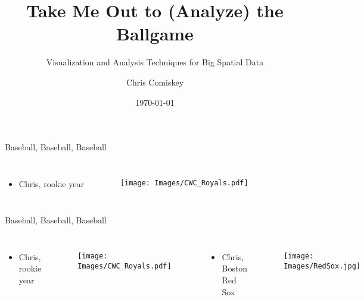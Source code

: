 \documentclass{beamer}
\title{Take Me Out to (Analyze) the Ballgame}
\subtitle{Visualization and Analysis Techniques for Big Spatial Data}
\author{Chris Comiskey}
\institute{Oregon State University}
\date{\today}
\begin{document}
\begin{frame}
  \titlepage
\end{frame}

% 

\begin{frame}{Baseball, Baseball, Baseball} %
\begin{columns}
\begin{itemize}
\item Chris, rookie year
\end{itemize}

        \begin{figure}[H]
      	\centering
      	\texttt{[image: Images/CWC\_Royals.pdf]}
      	\end{figure}



\end{columns}
\end{frame}

\begin{frame}{Baseball, Baseball, Baseball} %
\begin{columns}
\begin{itemize}
\item Chris, rookie year
\end{itemize}

        \begin{figure}[H]
      	\centering
      	\texttt{[image: Images/CWC\_Royals.pdf]}
      	\end{figure}

\begin{itemize}
\item Chris, Boston Red Sox
\end{itemize}
  \begin{figure}[H]
	\centering
	\texttt{[image: Images/RedSox.jpg]}
	\end{figure}

\end{columns}
\end{frame}
\end{document}
